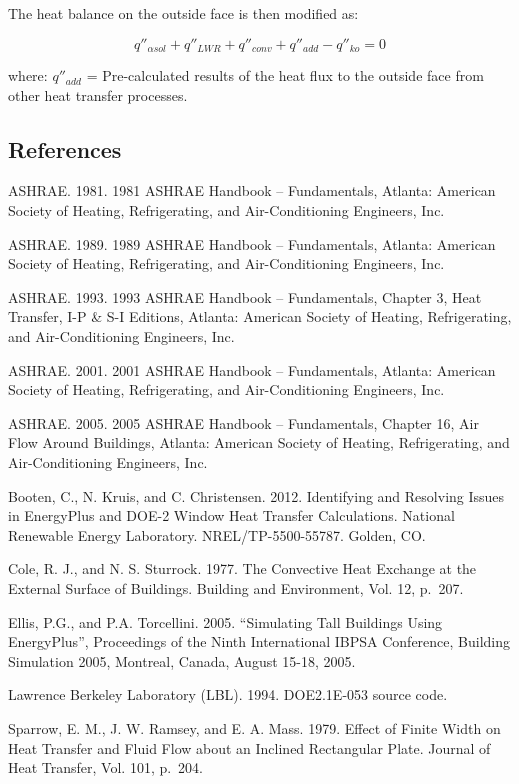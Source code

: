 The heat balance on the outside face is then modified as:

\begin{equation}
{q''_{\alpha sol}} + {q''_{LWR}} + {q''_{conv}} + {q''_{add}} - {q''_{ko}} = 0
\end{equation}

where:
\(q''_{add}\) = Pre-calculated results of the heat flux to the outside face from other heat transfer processes.

\subsection{References}\label{references-1-013}

ASHRAE. 1981. 1981 ASHRAE Handbook -- Fundamentals, Atlanta: American Society of Heating, Refrigerating, and Air-Conditioning Engineers, Inc.

ASHRAE. 1989. 1989 ASHRAE Handbook -- Fundamentals, Atlanta: American Society of Heating, Refrigerating, and Air-Conditioning Engineers, Inc.

ASHRAE. 1993. 1993 ASHRAE Handbook -- Fundamentals, Chapter 3, Heat Transfer, I-P \& S-I Editions, Atlanta: American Society of Heating, Refrigerating, and Air-Conditioning Engineers, Inc.

ASHRAE. 2001. 2001 ASHRAE Handbook -- Fundamentals, Atlanta: American Society of Heating, Refrigerating, and Air-Conditioning Engineers, Inc.

ASHRAE. 2005. 2005 ASHRAE Handbook -- Fundamentals, Chapter 16, Air Flow Around Buildings, Atlanta: American Society of Heating, Refrigerating, and Air-Conditioning Engineers, Inc.

Booten, C., N. Kruis, and C. Christensen. 2012. Identifying and Resolving Issues in EnergyPlus and DOE-2 Window Heat Transfer Calculations. National Renewable Energy Laboratory. NREL/TP-5500-55787. Golden, CO.

Cole, R. J., and N. S. Sturrock. 1977. The Convective Heat Exchange at the External Surface of Buildings. Building and Environment, Vol. 12, p.~207.

Ellis, P.G., and P.A. Torcellini. 2005. ``Simulating Tall Buildings Using EnergyPlus'', Proceedings of the Ninth International IBPSA Conference, Building Simulation 2005, Montreal, Canada, August 15-18, 2005.

Lawrence Berkeley Laboratory (LBL). 1994. DOE2.1E-053 source code.

Sparrow, E. M., J. W. Ramsey, and E. A. Mass. 1979. Effect of Finite Width on Heat Transfer and Fluid Flow about an Inclined Rectangular Plate. Journal of Heat Transfer, Vol. 101, p.~204.

